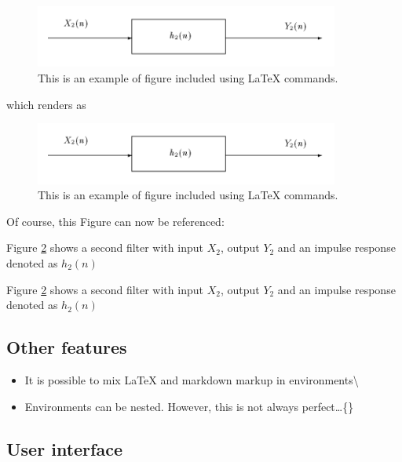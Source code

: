\begin{listing}
\begin{figure}[H]
\centerline{\includegraphics[width=10cm]{example.png}}
\caption{\label{fig:example} This is an example of figure included using LaTeX commands.}
\end{figure}
\end{listing}

which renders as

\begin{figure}[H]
\centerline{\includegraphics[width=10cm]{example.png}}
\caption{\label{fig:example} This is an example of figure included using LaTeX commands.}
\end{figure}

Of course, this Figure can now be referenced:

\begin{listing}
Figure \ref{fig:example} shows a second filter with input $X_2$, output $Y_2$  and an impulse response denoted as $h_2(n)$
\end{listing}

Figure \ref{fig:example} shows a second filter with input $X_2$,
output $Y_2$ and an impulse response denoted as $h_2(n)$

    \subsection{Other features}\label{other-features}

    \begin{itemize}
\itemsep1pt\parskip0pt \item It is possible to mix LaTeX and
markdown markup in environments\textbackslash{} \item Environments can
be nested. However, this is not always perfect\ldots\{\}
\end{itemize}

    \subsection{User interface}\label{user-interface}

